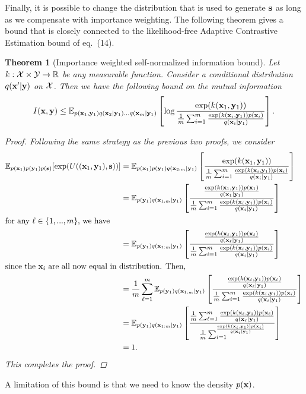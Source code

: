\documentclass[a4paper, 10pt]{report}
\theoremstyle{plain}
\newtheorem{theorem}{Theorem}[chapter]
\begin{document}
	Finally, it is possible to change the distribution that is used to generate ${\mathbf{s}}$ as long as we compensate with importance weighting. The following theorem gives a bound that is closely connected to the likelihood-free Adaptive Contrastive Estimation bound of \citet{foster2020unified} eq.~(14). 
	\begin{theorem}[Importance weighted self-normalized information bound]
		Let $k:{\mathcal{X}}\times {\mathcal{Y}}\to\mathbb{R}$ be any measurable function. Consider a conditional distribution $q({\mathbf{x}}'|{\mathbf{y}})$ on ${\mathcal{X}}$. Then we have the following bound on the mutual information
		\begin{equation}
		I({\mathbf{x}},{\mathbf{y}}) \le \mathbb{E}_{p({\mathbf{x}}_1,{\mathbf{y}}_1)q({\mathbf{x}}_{2}|{\mathbf{y}}_1)...q({\mathbf{x}}_m|{\mathbf{y}}_1)}\left[ \log \frac{\exp (k({\mathbf{x}}_1,{\mathbf{y}}_1))}{\frac{1}{m} \sum_{i=1}^m \frac{\exp (k({\mathbf{x}}_i,{\mathbf{y}}_1))p({\mathbf{x}}_i)}{q({\mathbf{x}}_i|{\mathbf{y}}_1)} }\right].
		\end{equation}
		\begin{proof}
			Following the same strategy as the previous two proofs, we consider 
			\begin{align}
			\mathbb{E}_{p({\mathbf{x}}_1)p({\mathbf{y}}_1)p({\mathbf{s}})}[\exp(U(({\mathbf{x}}_1,{\mathbf{y}}_1),{\mathbf{s}}))] &= \mathbb{E}_{p({\mathbf{x}}_{1})p({\mathbf{y}}_{1})q({\mathbf{x}}_{2:m}|{\mathbf{y}}_1)}\left[ \frac{\exp (k({\mathbf{x}}_1,{\mathbf{y}}_1))}{\frac{1}{m} \sum_{i=1}^m \frac{\exp (k({\mathbf{x}}_i,{\mathbf{y}}_1))p({\mathbf{x}}_i)}{q({\mathbf{x}}_i|{\mathbf{y}}_1)} }  \right] \\
			&= \mathbb{E}_{p({\mathbf{y}}_{1})q({\mathbf{x}}_{1:m}|{\mathbf{y}}_1)}\left[ \frac{\frac{\exp (k({\mathbf{x}}_1,{\mathbf{y}}_1))p({\mathbf{x}}_1)}{q({\mathbf{x}}_1|{\mathbf{y}}_1)}}{\frac{1}{m} \sum_{i=1}^m \frac{\exp (k({\mathbf{x}}_i,{\mathbf{y}}_1))p({\mathbf{x}}_i)}{q({\mathbf{x}}_i|{\mathbf{y}}_1)} }  \right] \\
			\intertext{for any $\ell\in\{1,...,m\}$, we have}
			&= \mathbb{E}_{p({\mathbf{y}}_{1})q({\mathbf{x}}_{1:m}|{\mathbf{y}}_1)}\left[ \frac{\frac{\exp (k({\mathbf{x}}_\ell,{\mathbf{y}}_1))p({\mathbf{x}}_\ell)}{q({\mathbf{x}}_\ell|{\mathbf{y}}_1)}}{\frac{1}{m} \sum_{i=1}^m \frac{\exp (k({\mathbf{x}}_i,{\mathbf{y}}_1))p({\mathbf{x}}_i)}{q({\mathbf{x}}_i|{\mathbf{y}}_1)} }  \right] \\
			\intertext{since the ${\mathbf{x}}_i$ are all now equal in distribution. Then,}
			&= \frac{1}{m}\sum_{\ell=1}^m\mathbb{E}_{p({\mathbf{y}}_{1})q({\mathbf{x}}_{1:m}|{\mathbf{y}}_1)}\left[ \frac{\frac{\exp (k({\mathbf{x}}_\ell,{\mathbf{y}}_1))p({\mathbf{x}}_\ell)}{q({\mathbf{x}}_\ell|{\mathbf{y}}_1)}}{\frac{1}{m} \sum_{i=1}^m \frac{\exp (k({\mathbf{x}}_i,{\mathbf{y}}_1))p({\mathbf{x}}_i)}{q({\mathbf{x}}_i|{\mathbf{y}}_1)} }  \right] \\
			&= \mathbb{E}_{p({\mathbf{y}}_{1})q({\mathbf{x}}_{1:m}|{\mathbf{y}}_1)}\left[ \frac{\frac{1}{m}\sum_{\ell=1}^m\frac{\exp (k({\mathbf{x}}_\ell,{\mathbf{y}}_1))p({\mathbf{x}}_\ell)}{q({\mathbf{x}}_\ell|{\mathbf{y}}_1)}}{\frac{1}{m} \sum_{i=1}^ \frac{\exp (k({\mathbf{x}}_i,{\mathbf{y}}_1))p({\mathbf{x}}_i)}{q({\mathbf{x}}_i|{\mathbf{y}}_1)} }  \right] \\
			&=1.
			\end{align}
			This completes the proof.
		\end{proof}
	\end{theorem}
	A limitation of this bound is that we need to know the density $p({\mathbf{x}})$.
	
\end{document}
